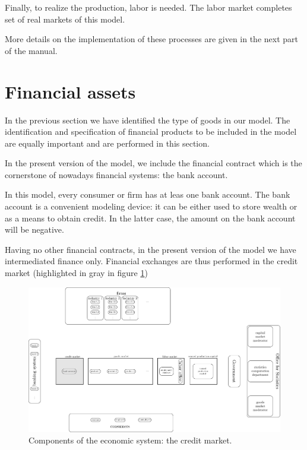 \documentclass{book}
\begin{document}
Finally, to realize the production, labor is needed.  The labor market completes set of real markets of this model.  

More details on the implementation of these processes are given in the next part of the manual.

\clearpage
\section{Financial assets}

In the previous section we have identified the type of goods in our model. The identification and specification of financial products to be included in the model are equally important and are performed in this section. 

In the present version of the model, we include the financial contract which is the cornerstone of nowadays financial systems: the bank account.

In this model, every consumer or firm has at leas one bank account. The bank account is a convenient modeling device: it can be either used to store wealth or as a means to obtain credit. In the latter case, the amount on the bank account will be negative.

Having no other financial contracts, in the present version of the model we have intermediated finance only. %
Financial exchanges are thus performed in the credit market (highlighted in gray in figure \ref{fig:componentsc3})

\begin{figure}[htp]
\hskip-1cm\includegraphics[scale=0.5]{agents_and_interactions_figure1c3-0.pdf}
	\caption{Components of the economic system: the credit market.}
	\label{fig:componentsc3}
\end{figure}
\end{document}
